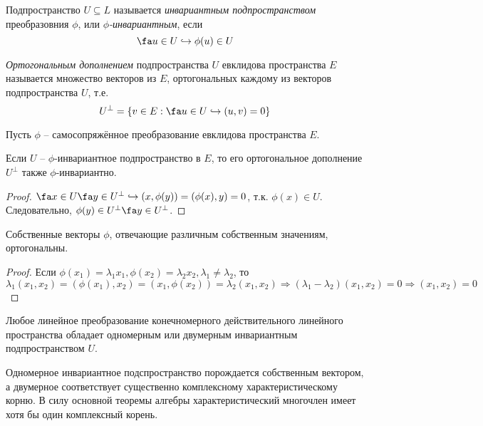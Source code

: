   \begin{defn}
  Подпространство $U \subseteq L$ называется \textit{инвариантным подпространством} преобразовния $\phi$, или \textit{$\phi$-инвариантным}, если
  \begin{equation}\label{23.1.invariant}
  \fa u \in U \hookrightarrow \phi(u) \in U
  \end{equation}
  \end{defn} 
  
  \begin{defn}
  \textit{Ортогональным дополнением} подпространства $U$ евклидова пространства $E$ называется множество векторов из $E$, ортогональных каждому из векторов подпространства $U$, т.е.
  \begin{equation}\label{23.1.orthogonal}
  U^\perp=\{v \in E: \fa u \in U \hookrightarrow (u,v)=0\}
  \end{equation}
  \end{defn}
  
  Пусть $\phi$ -- самосопряжённое преобразование евклидова \linebreak пространства $E$.
  \begin{stt}\label{23.1.stt_orth}
  Если $U$ -- $\phi$-инвариантное подпространство в $E$, то его ортогональное дополнение $U^\perp$ также $\phi$-инвариантно.
  \end{stt}
  \begin{proof}
  $\fa x \in U \fa y \in U^\perp \hookrightarrow (x,\phi(y))=(\phi(x),y)=0$, т.к. $\phi(x)\in U$. Следовательно, $\phi(y)\in U^\perp \fa y\in U^\perp$.
  \end{proof}
  
  \begin{stt}
  Собственные векторы $\phi$, отвечающие различным собственным значениям, ортогональны.
  \end{stt}
  \begin{proof}
  Если $\phi(x_1)=\lambda_1 x_1, \phi(x_2)=\lambda_2 x_2, \lambda_1 \neq \lambda_2$, то $\lambda_1(x_1,x_2)=(\phi(x_1),x_2)=(x_1,\phi(x_2))=\lambda_2(x_1,x_2) \Rightarrow (\lambda_1-\lambda_2)(x_1,x_2)=0 \Rightarrow (x_1,x_2)=0$
  \end{proof}    
    
  \begin{lemm}\label{23.1.lemm}
  Любое линейное преобразование конечномерного действительного линейного пространства обладает одномерным или двумерным инвариантным подпространством $U$.
  \end{lemm}
  \begin{notion}
  Одномерное инвариантное подспространство порождается собственным вектором, а двумерное соответствует существенно комплексному характеристическому корню. В силу основной теоремы алгебры характеристический многочлен имеет хотя бы один комплексный корень.
  \end{notion}
  

